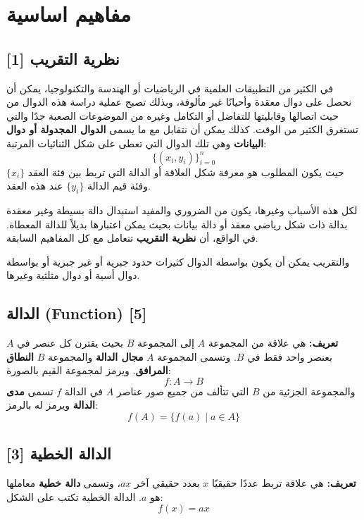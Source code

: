 \chapter{مفاهيم اساسية}
	
	\section{نظرية التقريب  [1]}
	
	في الكثير من التطبيقات العلمية في الرياضيات أو الهندسة والتكنولوجيا، يمكن أن نحصل على دوال معقدة وأحيانًا غير مألوفة، وبذلك تصبح عملية دراسة هذه الدوال من حيث اتصالها وقابليتها للتفاضل أو التكامل وغيره من الموضوعات الصعبة جدًا والتي تستغرق الكثير من الوقت.  
	كذلك يمكن أن نتقابل مع ما يسمى \textbf{الدوال المجدولة أو دوال البيانات} وهي تلك الدوال التي تعطى على شكل الثنائيات المرتبة:
	\[
	\{ (x_i, y_i) \}_{i=0}^{n}
	\]
	حيث يكون المطلوب هو معرفة شكل العلاقة أو الدالة التي تربط بين فئة العقد \(\{x_i\}\) وفئة قيم الدالة \(\{y_i\}\) عند هذه العقد.
	
	لكل هذه الأسباب وغيرها، يكون من الضروري والمفيد استبدال دالة بسيطة وغير معقدة بدالة ذات شكل رياضي معقد أو دالة بيانات بحيث يمكن اعتبارها بديلاً للدالة المعطاة. في الواقع، أن \textbf{نظرية التقريب} تتعامل مع كل المفاهيم السابقة.  
	
	والتقريب يمكن أن يكون بواسطة الدوال كثيرات حدود جبرية أو غير جبرية أو بواسطة دوال أسية أو دوال مثلثية وغيرها.
	
	\section{الدالة (Function) [5]}
	
	\textbf{تعريف:}  
	هي علاقة من المجموعة \( A \) إلى المجموعة \( B \) بحيث يقترن كل عنصر في \( A \) بعنصر واحد فقط في \( B \). وتسمى المجموعة \( A \) \textbf{مجال الدالة} والمجموعة \( B \) \textbf{النطاق المرافق}. ويرمز لمجموعة القيم بالصورة:
	\[
	f: A \to B
	\]
	والمجموعة الجزئية من \( B \) التي تتألف من جميع صور عناصر \( A \) في الدالة \( f \) تسمى \textbf{مدى الدالة} ويرمز له بالرمز:
	\[
	f(A) = \{ f(a) \mid a \in A \}
	\]
	
	\section{الدالة الخطية  [3]}
	
	\textbf{تعريف:}  
	هي علاقة تربط عددًا حقيقيًا \( x \) بعدد حقيقي آخر \( ax \)، وتسمى \textbf{دالة خطية} معاملها هو \( a \). الدالة الخطية تكتب على الشكل:
	\[
	f(x) = ax
	\]
	
